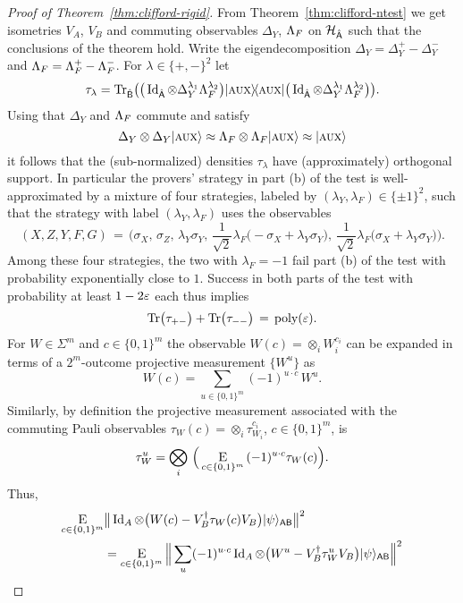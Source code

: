 \begin{proof}[Proof of Theorem~\ref{thm:clifford-rigid}]
From Theorem~\ref{thm:clifford-ntest} we get isometries $V_A$, $V_B$ and commuting observables $\Delta_Y$, $\Lambda_F$ on ${\mathcal{H}}_{\hat{{\textsf{A}}}}$ such that the conclusions of the theorem hold. Write the eigendecomposition $\Delta_Y = \Delta_Y^{+}-\Delta_Y^{-}$ and $\Lambda_F = \Lambda_F^{+}-\Lambda_F^{-}$. For $\lambda \in \{+,-\}^2$ let
$$\tau_{\lambda} = \mbox{\rm Tr}_{\hat{{\textsf{B}}}}\big( \big(\mathop{\rm Id}\nolimits_{\hat{{\textsf{A}}}}\otimes \Delta_Y^{\lambda_1}\Lambda_F^{\lambda_2} \big)|\textsc {aux}\rangle\!\langle\textsc {aux}|\big(\mathop{\rm Id}\nolimits_{\hat{{\textsf{A}}}}\otimes \Delta_Y^{\lambda_1}\Lambda_F^{\lambda_2}\big)\big).$$ 
Using that $\Delta_Y$ and $\Lambda_F$ commute and satisfy 
$$\Delta_Y \otimes \Delta_Y |\textsc {aux}\rangle \approx \Lambda_F\otimes \Lambda_F |\textsc {aux}\rangle \approx |\textsc {aux}\rangle$$
 it follows that the (sub-normalized) densities $\tau_{\lambda}$ have (approximately) orthogonal support. In particular the provers' strategy in part (b) of the test is well-approximated by a mixture of four strategies, labeled by $(\lambda_Y,\lambda_F)\in\{\pm 1\}^2$, such that the strategy with label $(\lambda_Y,\lambda_F)$ uses the observables 
$$(X,Z,Y,F,G)\,=\,\Big(\sigma_X,\,\sigma_Z,\,\lambda_Y\sigma_Y,\,\frac{1}{\sqrt{2}}\lambda_F\big(-\sigma_X + \lambda_Y\sigma_Y\big),\,\frac{1}{\sqrt{2}}\lambda_F\big(\sigma_X + \lambda_Y\sigma_Y\big)\Big).$$ 
Among these four strategies, the two with $\lambda_F=-1$ fail part (b) of the test with probability exponentially close to $1$. Success in both parts of the test with probability at least $1-2\varepsilon$ each thus implies
\begin{equation}\label{eq:tau-bound}
\mbox{\rm Tr}\big(\tau_{+-}\big)+\mbox{\rm Tr}\big(\tau_{--}\big) \,=\, \operatorname{poly}(\varepsilon).
\end{equation} 
For $W\in \Sigma^{m}$ and $c\in \{0,1\}^m$ the observable $W(c) = \otimes_i W_{i}^{c_i}$ can be expanded in terms of a $2^m$-outcome projective measurement $\{W^{u}\}$ as 
$$W(c) = \sum_{u\in \{0,1\}^m}  (-1)^{u\cdot c} \,W^{u}.$$
Similarly, by definition the projective measurement associated with the commuting Pauli observables $\tau_W(c) = \otimes_i \tau_{W_{i}}^{c_i}$, $c\in\{0,1\}^m$, is 
$$\tau_W^{u} = \bigotimes_i \,\Big(\mathop{\textsc{E}}_{c\in \{0,1\}^m} \,(-1)^{u \cdot c} \tau_W(c)\Big).$$ 
Thus,
\begin{align}
\Es{c\in\{0,1\}^m} & \big\| \Id_A \otimes \big(  W(c) - V_B^\dagger \tau_{W}(c) V_B\big)   \ket{\psi}_{\reg{AB}} \big\|^2\notag\\
&= \Es{c\in\{0,1\}^m}\Big\| \sum_{u} (-1)^{u\cdot c} \Id_A \otimes \big(  W^{u} - V_B^\dagger\tau_{W}^{u} V_B\big)   \ket{\psi}_{\reg{AB}} \Big\|^2    \notag\\

\end{align}
\end{proof}
